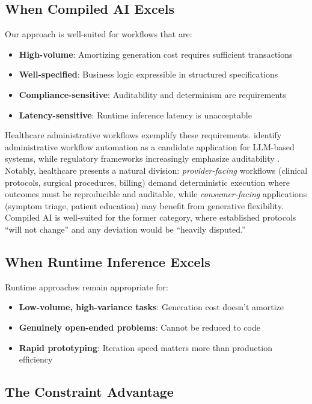 \documentclass[11pt]{article}
\begin{document}
\subsection{When Compiled AI Excels}

Our approach is well-suited for workflows that are:
\begin{itemize}
    \item \textbf{High-volume}: Amortizing generation cost requires sufficient transactions
    \item \textbf{Well-specified}: Business logic expressible in structured specifications
    \item \textbf{Compliance-sensitive}: Auditability and determinism are requirements
    \item \textbf{Latency-sensitive}: Runtime inference latency is unacceptable
\end{itemize}

Healthcare administrative workflows exemplify these requirements. \citet{qiu2024healthcare} identify administrative workflow automation as a candidate application for LLM-based systems, while regulatory frameworks increasingly emphasize auditability \citep{fda2025}. Notably, healthcare presents a natural division: \emph{provider-facing} workflows (clinical protocols, surgical procedures, billing) demand deterministic execution where outcomes must be reproducible and auditable, while \emph{consumer-facing} applications (symptom triage, patient education) may benefit from generative flexibility. Compiled AI is well-suited for the former category, where established protocols ``will not change'' and any deviation would be ``heavily disputed.''

\subsection{When Runtime Inference Excels}

Runtime approaches remain appropriate for:
\begin{itemize}
    \item \textbf{Low-volume, high-variance tasks}: Generation cost doesn't amortize
    \item \textbf{Genuinely open-ended problems}: Cannot be reduced to code
    \item \textbf{Rapid prototyping}: Iteration speed matters more than production efficiency
\end{itemize}

\subsection{The Constraint Advantage}
\end{document}

